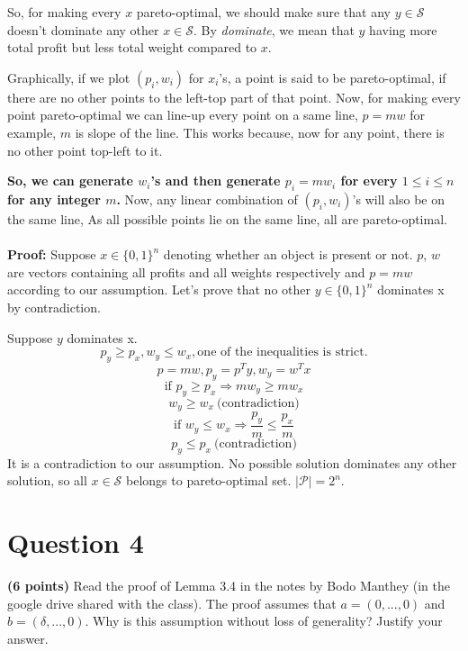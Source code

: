 \documentclass{article}
\begin{document}
So, for making every $x$ pareto-optimal, we should make sure that any $y \in \mathcal{S}$ doesn't dominate any other $x\in \mathcal{S}$. By \textit{dominate}, we mean that $y$ having more total profit but less total weight compared to $x$. 
\par Graphically, if we plot $(p_i, w_i)$ for  $x_i$'s, a point is said to be pareto-optimal, if there are no other points to the left-top part of that point. Now, for making every point pareto-optimal we can line-up every point on a same line, $p = mw$ for example, $m$ is slope of the line. This works because, now for any point, there is no other point top-left to it.
\par \textbf{So, we can generate $w_i$'s and then generate $p_i = m w_i$ for every $1\leq i\leq n$ for any integer $m$.} Now, any linear combination of $(p_i, w_i)$'s will also be on the same line, As all possible points lie on the same line, all are pareto-optimal. \\ \\
\textbf{Proof:} Suppose $x \in \{0, 1\}^n$ denoting whether an object is present or not. $p$, $w$ are vectors containing all profits and all weights respectively and $p=mw$ according to our assumption. Let's prove that no other $y \in \{0, 1\}^n$ dominates x by contradiction.
\par Suppose $y$ dominates x.
$$p_y \geq p_x, w_y \leq w_x, \text{one of the inequalities is strict.}$$
$$p = mw, p_y = p^Ty, w_y = w^Tx$$
$$\text{if }p_y \geq p_x \Rightarrow mw_y \geq mw_x$$
$$w_y \geq w_x \  \text{(contradiction)}$$
$$\text{if }w_y \leq w_x \Rightarrow \frac{p_y}{m} \leq \frac{p_x}{m}$$
$$p_y \leq p_x \ \text{(contradiction)}$$
It is a contradiction to our assumption. No possible solution dominates any other solution, so all $x \in \mathcal{S}$ belongs to pareto-optimal set. $|\mathcal{P}| = 2^n$.
\newpage
\section*{Question 4}
\textbf{(6 points)} Read the proof of Lemma 3.4 in the notes by Bodo Manthey (in the google drive shared with the class). The proof assumes that $a = (0,...,0)$ and $b = (\delta,...,0)$.
Why is this assumption without loss of generality? Justify your answer.
\end{document}
